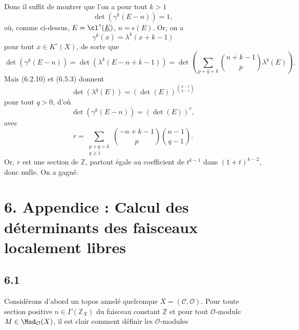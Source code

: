 Donc il suffit de montrer que l'on a pour tout \(k>1\)
\[
 \det(\gamma^k(E-n))=1,
\]
où, comme ci-dessus, \(E=\cl^\circ(\underline E)\), \(n=\epsilon(E)\). Or, on a
\[
 \gamma^k(x)=\lambda^k(x+k-1)
\]
pour tout \(x\in K^\circ(X)\), de sorte que
\[
 \det(\gamma^k(E-n))
 =
 \det(\lambda^k(E-n+k-1))
 =
 \det\left(\sum_{p+q=k}\binom{n+k-1}{p}\lambda^q(E)\right).
\]
Mais (6.2.10) et (6.5.3) donnent
\[
 \det(\lambda^q(E))=(\det(E))^{\binom{n-1}{q-1}}
\]
pour tout \(q>0\), d'où
\[
 \det(\gamma^k(E-n))=(\det(E))^r,
\]
avec
\[
 r=\sum_{\substack{p+q=k\\ q\geq1}}
 \binom{-n+k-1}{p}\binom{n-1}{q-1}.
\]
Or, \(r\) est une section de \(\mathbb Z\), partout égale au coefficient de \(t^{k-1}\) dans \((1+t)^{k-2}\), donc nulle. On a gagné.

\section*{6. Appendice : Calcul des déterminants des faisceaux localement libres}

\subsection*{6.1}
Considérons d'abord un topos annelé quelconque \(X=(\mathcal C,\mathcal O)\). Pour toute section positive \(n\in\Gamma(\mathbb Z_X)\) du faisceau constant \(\mathbb Z\) et pour tout \(\mathcal O\)-module \(M\in\Mod_{\mathcal O}(X)\), il est clair comment définir les \(\mathcal O\)-modules
